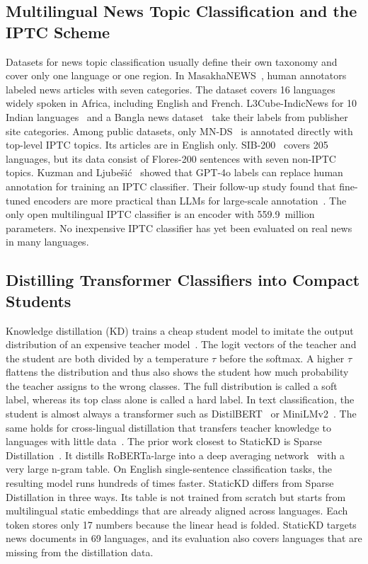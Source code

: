 \documentclass[journal]{IEEEtran}
\begin{document}
\subsection{Multilingual News Topic Classification and the IPTC Scheme}
Datasets for news topic classification usually define their own taxonomy and cover only one language or one region. In MasakhaNEWS~\cite{adelani2023masakhanews}, human annotators labeled news articles with seven categories. The dataset covers 16 languages widely spoken in Africa, including English and French. L3Cube-IndicNews for 10 Indian languages~\cite{mirashi2023indicnews} and a Bangla news dataset~\cite{hossain2025banglanews} take their labels from publisher site categories. Among public datasets, only MN-DS~\cite{petukhova2023mnds} is annotated directly with top-level IPTC topics. Its articles are in English only. SIB-200~\cite{adelani2024sib200} covers 205 languages, but its data consist of Flores-200 sentences with seven non-IPTC topics. Kuzman and Ljube\v{s}i\'c~\cite{kuzman2025llm} showed that GPT-4o labels can replace human annotation for training an IPTC classifier. Their follow-up study found that fine-tuned encoders are more practical than LLMs for large-scale annotation~\cite{kuzman2025southslavic}. The only open multilingual IPTC classifier is an encoder with 559.9~million parameters. No inexpensive IPTC classifier has yet been evaluated on real news in many languages.

\subsection{Distilling Transformer Classifiers into Compact Students}
Knowledge distillation (KD) trains a cheap student model to imitate the output distribution of an expensive teacher model~\cite{hinton2015distilling,yang2025kdsurvey}. The logit vectors of the teacher and the student are both divided by a temperature $\tau$ before the softmax. A higher $\tau$ flattens the distribution and thus also shows the student how much probability the teacher assigns to the wrong classes. The full distribution is called a soft label, whereas its top class alone is called a hard label. In text classification, the student is almost always a transformer such as DistilBERT~\cite{sanh2019distilbert} or MiniLMv2~\cite{wang2021minilmv2}. The same holds for cross-lingual distillation that transfers teacher knowledge to languages with little data~\cite{piperno2025crosslingual}. The prior work closest to StaticKD is Sparse Distillation~\cite{ye2022sparse}. It distills RoBERTa-large into a deep averaging network~\cite{iyyer2015dan} with a very large n-gram table. On English single-sentence classification tasks, the resulting model runs hundreds of times faster. StaticKD differs from Sparse Distillation in three ways. Its table is not trained from scratch but starts from multilingual static embeddings that are already aligned across languages. Each token stores only 17 numbers because the linear head is folded. StaticKD targets news documents in 69 languages, and its evaluation also covers languages that are missing from the distillation data.
\end{document}
